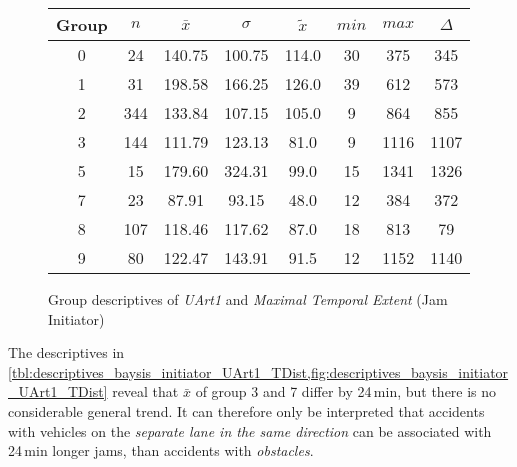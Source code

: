 \begin{figure}[ht!]
	\centering
	\begin{minipage}{0.5\textwidth}
		\tiny
		\setlength{\tabcolsep}{4pt}
		\centering
		\begin{tabular}{c|c|c|c|c|c|c|c}
			\toprule
			Group & $n$ & $\bar{x}$ & $\sigma$ & $\tilde{x}$ & $min$ & $max$ & $\Delta$ \\
			\midrule
			0 & 24  & 140.75 & 100.75 & 114.0 & 30 & 375  & 345  \\
			1 & 31  & 198.58 & 166.25 & 126.0 & 39 & 612  & 573  \\
			2 & 344 & 133.84 & 107.15 & 105.0 & 9  & 864  & 855  \\
			3 & 144 & 111.79 & 123.13 & 81.0  & 9  & 1116 & 1107 \\
			5 & 15  & 179.60 & 324.31 & 99.0  & 15 & 1341 & 1326 \\
			7 & 23  & 87.91  & 93.15  & 48.0  & 12 & 384  & 372  \\
			8 & 107 & 118.46 & 117.62 & 87.0  & 18 & 813  & 79   \\
			9 & 80  & 122.47 & 143.91 & 91.5  & 12 & 1152 & 1140 \\
			\bottomrule
		\end{tabular}
		\label{tbl:descriptives_baysis_initiator_UArt1_TMax}
	\end{minipage}%
	\begin{minipage}{0.55\textwidth}
		\data 
        \pgfplotstablesort[sort key=mean, sort cmp=float >]{\datasorted}{\data}
        \tiny
        \centering
		\label{fig:descriptives_baysis_initiator_UArt1_TMax}
	\end{minipage}%
	\caption{Group descriptives of \textit{UArt1} and \textit{Maximal Temporal Extent} (Jam Initiator)}
\end{figure}
The descriptives in \cref{tbl:descriptives_baysis_initiator_UArt1_TDist,fig:descriptives_baysis_initiator_UArt1_TDist} reveal that $\bar{x}$ of group 3 and 7 differ by 24\,min, but there is no considerable general trend. It can therefore only be interpreted that accidents with vehicles on the \textit{separate lane in the same direction} can be associated with 24\,min longer jams, than accidents with \textit{obstacles}.

